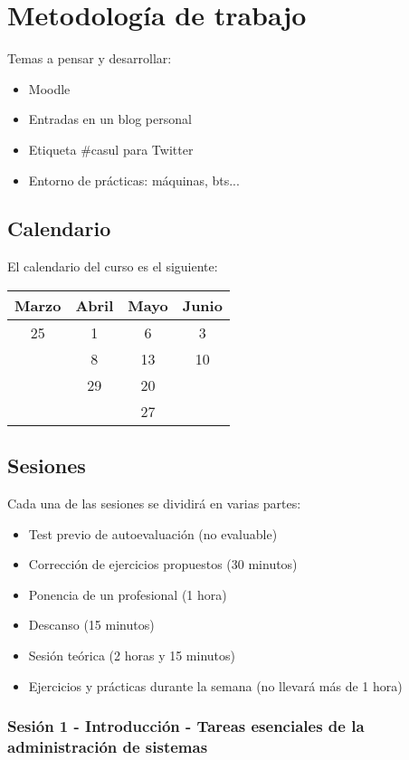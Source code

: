 \documentclass[a4paper]{article}
\begin{document}
  \section{Metodología de trabajo}
    Temas a pensar y desarrollar:
    \begin{itemize}
      \item Moodle
      \item Entradas en un blog personal
      \item Etiqueta \#casul para Twitter
      \item Entorno de prácticas: máquinas, bts...
    \end{itemize}
    \subsection{Calendario}
    El calendario del curso es el siguiente: 

\medskip

    \begin{tabular}{| c | c | c | c |}
      \hline
      Marzo & Abril & Mayo & Junio \\
      \hline
      25 & 1 & 6 & 3 \\
      & 8 & 13 & 10 \\
      & 29 & 20 & \\
      & & 27 & \\
      \hline
    \end{tabular}

    \subsection{Sesiones}
      Cada una de las sesiones se dividirá en varias partes:
      \begin{itemize}
        \item Test previo de autoevaluación (no evaluable)
        \item Corrección de ejercicios propuestos (30 minutos)
        \item Ponencia de un profesional (1 hora)
        \item Descanso (15 minutos)
        \item Sesión teórica (2 horas y 15 minutos)
        \item Ejercicios y prácticas durante la semana (no llevará más de 1 hora)
      \end{itemize}

      \subsubsection{Sesión 1 - Introducción - Tareas esenciales de la administración de sistemas}
         
\end{document}
